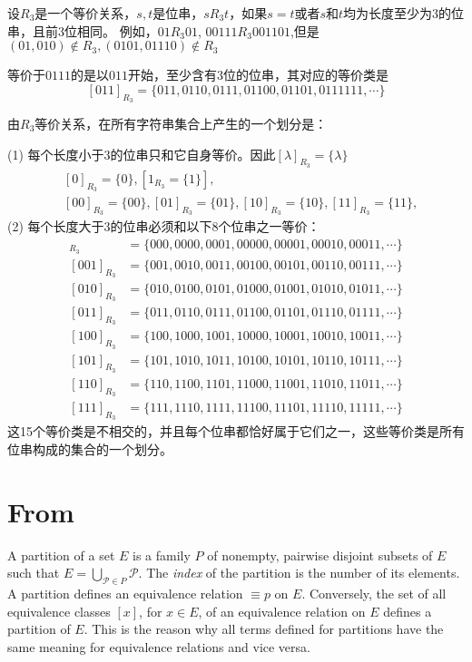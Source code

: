 \begin{example}
设$R_3$是一个等价关系，$s,t$是位串，$sR_3t$，如果$s=t$或者$s$和$t$均为长度至少为3的位串，且前3位相同。
例如，$01R_3 01$, $00111R_3 001101$,但是$(01,010)\notin R_3, (0101,01110)\notin R_3$

等价于$0111$的是以$011$开始，至少含有3位的位串，其对应的等价类是
\[[011]_{R_3}=\{011,0110,0111,01100,01101,0111111,\cdots\}\]

由$R_3$等价关系，在所有字符串集合上产生的一个划分是：

(1) 每个长度小于3的位串只和它自身等价。因此$[\lambda]_{R_3}=\{\lambda \}$
\begin{align*}
	&[0]_{R_3}=\{0\},[1_{R_3}=\{1\}],\\
	&[00]_{R_3}=\{00\},[01]_{R_3}=\{01\},[10]_{R_3}=\{10\},[11]_{R_3}=\{11\},
\end{align*}
(2) 每个长度大于3的位串必须和以下8个位串之一等价：
\begin{align*}
[000]_{R_3} &=\{000,0000,0001,00000,00001,00010,00011,\cdots \} \\
[001]_{R_3} &=\{001,0010,0011,00100,00101,00110,00111,\cdots \} \\
[010]_{R_3} &=\{010,0100,0101,01000,01001,01010,01011,\cdots \} \\
[011]_{R_3} &=\{011,0110,0111,01100,01101,01110,01111,\cdots \} \\
[100]_{R_3} &=\{100,1000,1001,10000,10001,10010,10011,\cdots \} \\
[101]_{R_3} &=\{101,1010,1011,10100,10101,10110,10111,\cdots \} \\
[110]_{R_3} &=\{110,1100,1101,11000,11001,11010,11011,\cdots \} \\
[111]_{R_3} &=\{111,1110,1111,11100,11101,11110,11111,\cdots \}
\end{align*}
这15个等价类是不相交的，并且每个位串都恰好属于它们之一，这些等价类是所有位串构成的集合的一个划分。
\end{example}

\section{From \cite{Jean2011}}

\begin{definition} 
	A partition of a set $E$ is a family $P$ of nonempty,	pairwise disjoint subsets of $E$ such that $E =	\bigcup_{\mathcal{P}\in P}\mathcal{P}$. The \textit{index} of the partition is the number of its elements. A partition defines an equivalence relation $\equiv p$ on $E$. Conversely,
	the set of all equivalence classes $[x]$, for $x \in E$, of an equivalence relation on $E$ defines	a partition of $E$. This is the reason why all terms defined for partitions have the same
	meaning for equivalence relations and vice versa.
\end{definition}


